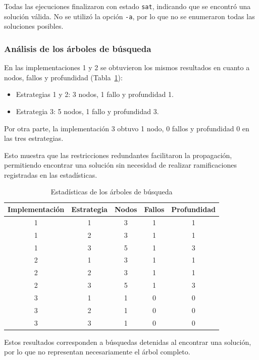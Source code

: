 Todas las ejecuciones finalizaron con estado \texttt{sat}, indicando que se encontró una solución válida. No se utilizó la opción \texttt{-a}, por lo que no se enumeraron todas las soluciones posibles.

\subsubsection{Análisis de los árboles de búsqueda}

En las implementaciones 1 y 2 se obtuvieron los mismos resultados en cuanto a nodos, fallos y profundidad (Tabla~\ref{tab:acertijo-arbol}):

\begin{itemize}
    \item Estrategias 1 y 2: 3 nodos, 1 fallo y profundidad 1.
    \item Estrategia 3: 5 nodos, 1 fallo y profundidad 3.
\end{itemize}

Por otra parte, la implementación 3 obtuvo 1 nodo, 0 fallos y profundidad 0 en las tres estrategias.

Esto muestra que las restricciones redundantes facilitaron la propagación, permitiendo encontrar una solución sin necesidad de realizar ramificaciones registradas en las estadísticas.

\begin{table}[htbp]
\caption{Estadísticas de los árboles de búsqueda}
\label{tab:acertijo-arbol}
\begin{tabular}{@{}ccccc@{}}
\toprule
\textbf{Implementación} & \textbf{Estrategia} & \textbf{Nodos} & \textbf{Fallos} & \textbf{Profundidad} \\
\midrule
1 & 1 & 3 & 1 & 1 \\
1 & 2 & 3 & 1 & 1 \\
1 & 3 & 5 & 1 & 3 \\
2 & 1 & 3 & 1 & 1 \\
2 & 2 & 3 & 1 & 1 \\
2 & 3 & 5 & 1 & 3 \\
3 & 1 & 1 & 0 & 0 \\
3 & 2 & 1 & 0 & 0 \\
3 & 3 & 1 & 0 & 0 \\
\bottomrule
\end{tabular}
\end{table}

Estos resultados corresponden a búsquedas detenidas al encontrar una solución, por lo que no representan necesariamente el árbol completo.

